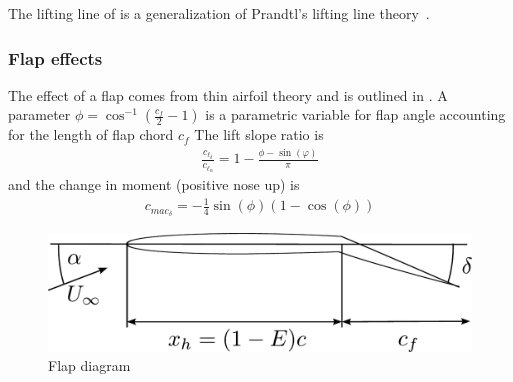 \documentclass[10pt]{article}
\newcommand{\be}{\begin{eqnarray}}
\newcommand{\ee}{\end{eqnarray}}
\newcommand{\Uinf}{U_{\infty}}
\begin{document}
The lifting line of \citet{Phillips2000} is a generalization of Prandtl's lifting line theory~\cite{Prandtl1918a}.

\subsubsection{Flap effects}
The effect of a flap comes from thin airfoil theory and is outlined in \citet{Glauert1924,Glauert1927}.
A parameter $\phi = \cos^{-1}\left(\frac{c_f}{2} -1\right)$ is a parametric variable for flap angle accounting for the length of flap chord $c_f$
The lift slope ratio is
\be
\frac{c_{\ell_\delta}}
{c_{\ell_\alpha}}
=
1 - \frac{\phi - \sin(\varphi)}{\pi}
\ee
and the change in moment (positive nose up) is
\be
c_{mac_{\delta}} = -\frac{1}{4}\sin(\phi) \left( 1 - \cos(\phi)\right)
\ee
\begin{figure}[htbp!]
    \centering
    \includegraphics[width=0.5\linewidth,clip,trim={0cm 0cm 0cm 0cm}]{FlapHydrofoil.pdf}
    \caption{\label{fig:Flap}
        Flap diagram
    }
\end{figure}
\end{document}
